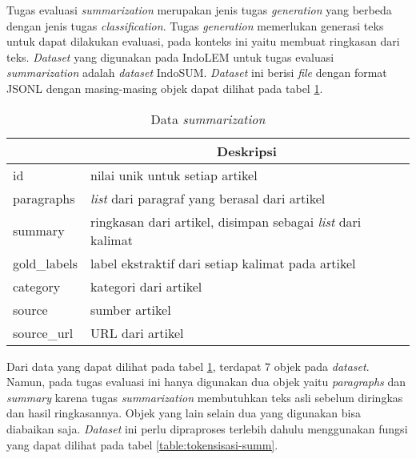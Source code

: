 Tugas evaluasi \textit{summarization} merupakan jenis tugas \textit{generation} yang berbeda dengan jenis tugas \textit{classification}. Tugas \textit{generation} memerlukan generasi teks untuk dapat dilakukan evaluasi, pada konteks ini yaitu membuat ringkasan dari teks. \textit{Dataset} yang digunakan pada IndoLEM untuk tugas evaluasi \textit{summarization} adalah \textit{dataset} IndoSUM. \textit{Dataset} ini berisi \textit{file} dengan format JSONL dengan masing-masing objek dapat dilihat pada tabel \ref{table:data-summarization}.

\begin{table}[h]
    \vspace{0.25cm}
    \caption{Data \textit{summarization}}
    \label{table:data-summarization}
    \begin{center}
        \begin{tabular}{|l|l|}
            \hline \rowcolor{black!10}
            \multicolumn{1}{|c|}{\textbf{Objek}} & \multicolumn{1}{|c|}{\textbf{Deskripsi}} \\ \hline
            id & nilai unik untuk setiap artikel \\ \hline
            paragraphs & \textit{list} dari paragraf yang berasal dari artikel \\ \hline
            summary & ringkasan dari artikel, disimpan sebagai \textit{list} dari kalimat \\ \hline 
            gold\_labels & label ekstraktif dari setiap kalimat pada artikel \\ \hline
            category & kategori dari artikel \\ \hline
            source & sumber artikel \\ \hline
            source\_url & URL dari artikel \\ \hline
        \end{tabular}
    \end{center}
\end{table}

Dari data yang dapat dilihat pada tabel \ref{table:data-summarization}, terdapat 7 objek  pada \textit{dataset}. Namun, pada tugas evaluasi ini hanya  digunakan dua objek yaitu \textit{paragraphs} dan \textit{summary} karena tugas \textit{summarization} membutuhkan teks asli sebelum diringkas dan hasil ringkasannya. Objek yang lain selain dua yang digunakan bisa diabaikan saja. \textit{Dataset} ini perlu dipraproses terlebih dahulu menggunakan fungsi yang dapat dilihat pada tabel \ref{table:tokensisasi-summ}.

